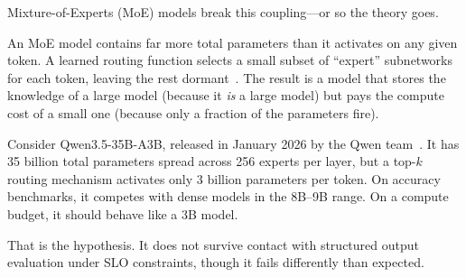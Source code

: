 \documentclass[11pt]{article}
\begin{document}
Mixture-of-Experts (MoE) models break this coupling---or so the theory goes.

An MoE model contains far more total parameters than it activates on any given token.  A learned routing function selects a small subset of ``expert'' subnetworks for each token, leaving the rest dormant~\citep{shazeer2017outrageously, fedus2022switch}.  The result is a model that stores the knowledge of a large model (because it \emph{is} a large model) but pays the compute cost of a small one (because only a fraction of the parameters fire).

Consider Qwen3.5-35B-A3B, released in January 2026 by the Qwen team~\citep{qwen2025qwen3}.  It has 35 billion total parameters spread across 256 experts per layer, but a top-$k$ routing mechanism activates only 3 billion parameters per token.  On accuracy benchmarks, it competes with dense models in the 8B--9B range.  On a compute budget, it should behave like a 3B model.

That is the hypothesis.  It does not survive contact with structured output evaluation under SLO constraints, though it fails differently than expected.
\end{document}
